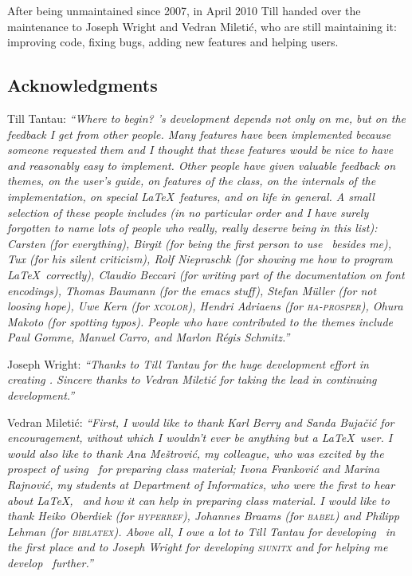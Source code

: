 After being unmaintained since 2007, in April 2010 Till handed over the maintenance to Joseph Wright and Vedran Mileti\'c, who are still maintaining it: improving code, fixing bugs, adding new features and helping users.


\subsection{Acknowledgments}

Till Tantau: \emph{``Where to begin? \beamer's development depends not only on me, but on the feedback I get from other people. Many features have been implemented because someone requested them and I thought that these features would be nice to have and reasonably easy to implement. Other people have given valuable feedback on themes, on the user's guide, on features of the class, on the internals of the implementation, on special \LaTeX\ features, and on life in general. A small selection of these people includes (in no particular order and I have surely forgotten to name lots of people who really, really deserve being in this list): Carsten (for everything), Birgit (for being the first person to use \beamer\ besides me), Tux (for his silent criticism), Rolf Niepraschk (for showing me how to program \LaTeX\ correctly), Claudio Beccari (for writing part of the documentation  on font encodings), Thomas Baumann (for the emacs stuff), Stefan M\"uller (for not loosing hope), Uwe Kern (for \textsc{xcolor}), Hendri Adriaens (for \textsc{ha-prosper}), Ohura Makoto (for spotting typos). People who have contributed to the themes include Paul Gomme, Manuel Carro, and Marlon R\'egis Schmitz.''}

Joseph Wright: \emph{``Thanks to Till Tantau for the huge development effort in creating \beamer. Sincere thanks to Vedran Mileti\'c for taking the lead in continuing development.''}

Vedran Mileti\'c: \emph{``First, I would like to thank Karl Berry and Sanda Buja\v ci\'c for encouragement, without which I wouldn't ever be anything but a \LaTeX\ user. I would also like to thank Ana Me\v strovi\'c, my colleague, who was excited by the prospect of using \beamer\ for preparing class material; Ivona Frankovi\'c and Marina Rajnovi\'c, my students at Department of Informatics, who were the first to hear about \LaTeX, \beamer\ and how it can help in preparing class material. I would like to thank Heiko Oberdiek (for \textsc{hyperref}), Johannes Braams (for \textsc{babel}) and Philipp Lehman (for \textsc{biblatex}). Above all, I owe a lot to Till Tantau for developing \beamer\ in the first place and to Joseph Wright for developing \textsc{siunitx} and for helping me develop \beamer\ further.''}


